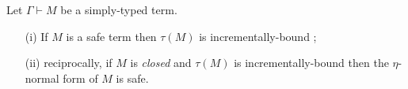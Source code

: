 

\begin{lem}
\label{lem:safe_imp_incrbound} Let $\Gamma \vdash M$ be a
simply-typed term.
\begin{itemize}
\item[(i)] If $M$ is a safe term then $\tau(M)$ is incrementally-bound ;
\item[(ii)] reciprocally, if $M$ is \emph{closed} and $\tau(M)$ is incrementally-bound then the $\eta$-normal form of $M$ is safe.
\end{itemize}
\end{lem}
